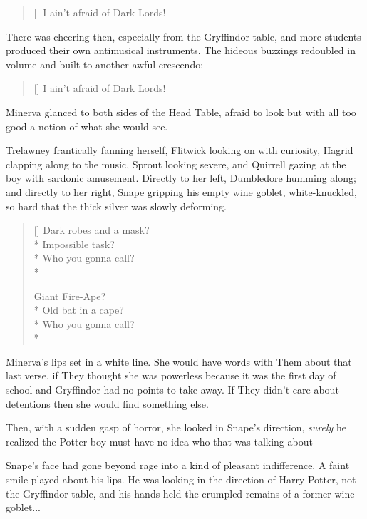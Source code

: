 \begin{verse}[\versewidth]
I ain’t afraid of Dark Lords!
\end{verse}

There was cheering then, especially from the Gryffindor table, and more students produced their own antimusical instruments. The hideous buzzings redoubled in volume and built to another awful crescendo:

\begin{verse}[\versewidth]
I ain’t afraid of Dark Lords!
\end{verse}

Minerva glanced to both sides of the Head Table, afraid to look but with all too good a notion of what she would see.

Trelawney frantically fanning herself, Flitwick looking on with curiosity, Hagrid clapping along to the music, Sprout looking severe, and Quirrell gazing at the boy with sardonic amusement. Directly to her left, Dumbledore humming along; and directly to her right, Snape gripping his empty wine goblet, white-knuckled, so hard that the thick silver was slowly deforming.

\begin{verse}[\versewidth]
Dark robes and a mask?\\*
Impossible task?\\*
Who you gonna call?\\*

Giant Fire-Ape?\\*
Old bat in a cape?\\*
Who you gonna call?\\*
\end{verse}

Minerva’s lips set in a white line. She would have words with Them about that last verse, if They thought she was powerless because it was the first day of school and Gryffindor had no points to take away. If They didn’t care about detentions then she would find something else.

Then, with a sudden gasp of horror, she looked in Snape’s direction, \emph{surely} he realized the Potter boy must have no idea who that was talking about—

Snape’s face had gone beyond rage into a kind of pleasant indifference. A faint smile played about his lips. He was looking in the direction of Harry Potter, not the Gryffindor table, and his hands held the crumpled remains of a former wine goblet...

